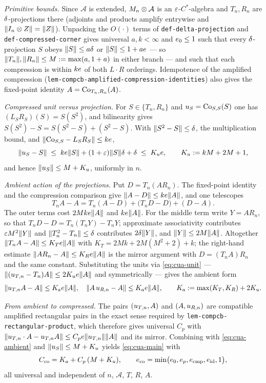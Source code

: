 \emph{Primitive bounds.} Since $\mathcal A$ is extended, $M_{n}\otimes \mathcal A$ is an
$\varepsilon$-$C^*$-algebra and $T_n,R_n$ are $\delta$-projections there
(adjoints and products amplify entrywise and $\lVert I_{n}\otimes Z\rVert=\lVert Z\rVert$). Unpacking the
$O(\cdot)$ terms of \texttt{def-delta-projection} and \texttt{def-compressed-corner} gives
universal $a,k<\infty$ and $e_0\le1$ such that every $\delta$-projection $S$ obeys
$\lVert S\rVert\le a\delta$ or $\lVert S\rVert\le1+ae$ --- so $\lVert T_n\rVert,\lVert R_n\rVert\le M:=\max(a,1+a)$
in either branch --- and such that each compression is within $ke$ of both
$L\cdot R$ orderings. Idempotence of the amplified compression
(\texttt{lem-compcb-amplified-compression-identities}) also gives the fixed-point identity
$A=\mathrm{Co}_{T_n,R_n}(A)$.

\emph{Compressed unit versus projection.} For $S\in\{T_n,R_n\}$ and $u_{S}=\mathrm{Co}_{S,S}(S)$
one has $(L_SR_S)(S)=S(S^2)$, and bilinearity gives $S(S^2)-S=S(S^2-S)+(S^2-S)$. With
$\lVert S^2-S\rVert\le\delta$, the multiplication bound, and
$\lVert \mathrm{Co}_{S,S}-L_SR_S\rVert\le ke$,
\begin{equation}\label{eq:cua-unit}
  \lVert u_{S}-S\rVert\;\le\;ke\lVert S\rVert+(1+\varepsilon)\lVert S\rVert\delta+\delta
  \;\le\;K_ue,\qquad K_u:=kM+2M+1,
\end{equation}
and hence $\lVert u_{S}\rVert\le M+K_u$, uniformly in $n$.

\emph{Ambient action of the projections.} Put $D=T_n(AR_n)$. The fixed-point identity and
the compression comparison give $\lVert A-D\rVert\le ke\lVert A\rVert$, and one telescopes
\[
  T_nA-A=T_n(A-D)+\bigl(T_nD-D\bigr)+(D-A).
\]
The outer terms cost $2Mke\lVert A\rVert$ and $ke\lVert A\rVert$. For the middle term write
$Y=AR_n$, so that $T_nD-D=T_n(T_nY)-T_nY$; approximate associativity contributes
$\varepsilon M^2\lVert Y\rVert$ and $\lVert T_n^2-T_n\rVert\le\delta$ contributes $2\delta\lVert Y\rVert$, and
$\lVert Y\rVert\le2M\lVert A\rVert$. Altogether $\lVert T_nA-A\rVert\le K_Te\lVert A\rVert$ with
$K_T=2Mk+2M(M^2+2)+k$; the right-hand estimate $\lVert AR_n-A\rVert\le K_Re\lVert A\rVert$ is the
mirror argument with $D=(T_nA)R_n$ and the same constant. Substituting the units via
\eqref{eq:cua-unit} --- $\lVert (u_{T,n}-T_n)A\rVert\le2K_ue\lVert A\rVert$ and symmetrically ---
gives the ambient form
\begin{equation}\label{eq:cua-ambient}
  \lVert u_{T,n}A-A\rVert\le K_ae\lVert A\rVert,\quad
  \lVert A\,u_{R,n}-A\rVert\le K_ae\lVert A\rVert,\qquad
  K_a:=\max(K_T,K_R)+2K_u .
\end{equation}

\emph{From ambient to compressed.} The pairs $(u_{T,n},A)$ and $(A,u_{R,n})$ are
compatible amplified rectangular pairs in the exact sense required by
\texttt{lem-compcb-rectangular-product}, which therefore gives universal $C_p$ with
$\lVert u_{T,n}\mathbin{\cdot} A-u_{T,n}A\rVert\le C_pe\lVert u_{T,n}\rVert\lVert A\rVert$ and its mirror.
Combining with \eqref{eq:cua-ambient} and $\lVert u_{S}\rVert\le M+K_u$ yields
\eqref{eq:cua-main} with
\[
  C_{\mathrm{co}}=K_a+C_p\,(M+K_u),
  \qquad
  e_{\mathrm{co}}=\min\bigl(e_0,e_p,e_{\mathrm{cmp}},e_{\mathrm{id}},1\bigr),
\]
all universal and independent of $n$, $\mathcal A$, $T$, $R$, $A$.

